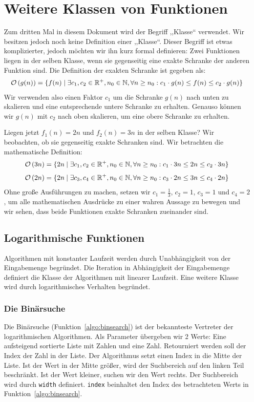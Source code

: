 \section{Weitere Klassen von Funktionen}
%
Zum dritten Mal in diesem Dokument wird der Begriff ,,Klasse`` verwendet. Wir besitzen jedoch noch keine Definition einer ,,Klasse``. Dieser Begriff ist etwas komplizierter, jedoch möchten wir ihn kurz formal definieren:
Zwei Funktionen liegen in der selben Klasse, wenn sie gegenseitig eine exakte Schranke der anderen Funktion sind. Die Definition der exakten Schranke ist gegeben als:
\[
  \mathcal{O}\left(g(n)\right) = \{ f(n) \mid \exists c_1, c_2 \in \mathbb{R}^+, n_0 \in \mathbb{N},
                 \forall n \geq n_0: c_1 \cdot g(n) \leq f(n) \leq c_2 \cdot g(n) \}
\]
%
Wir verwenden also einen Faktor $c_1$ um die Schranke $g(n)$ nach unten zu skalieren und eine entsprechende untere Schranke zu erhalten. Genauso können wir $g(n)$ mit $c_2$ nach oben skalieren, um eine obere Schranke zu erhalten.

Liegen jetzt $f_1(n) = 2n$ und $f_2(n) = 3n$ in der selben Klasse? Wir beobachten, ob sie gegenseitig exakte Schranken sind. Wir betrachten die mathematische Definition:
\[
  \mathcal{O}\left(3n\right) = \{ 2n \mid \exists c_1, c_2 \in \mathbb{R}^+, n_0 \in \mathbb{N},
              \forall n \geq n_0: c_1 \cdot 3n \leq 2n \leq c_2 \cdot 3n \}
\] \[
  \mathcal{O}\left(2n\right) = \{ 2n \mid \exists c_3, c_4 \in \mathbb{R}^+, n_0 \in \mathbb{N},
              \forall n \geq n_0: c_3 \cdot 2n \leq 3n \leq c_4 \cdot 2n \}
\]
%
Ohne große Ausführungen zu machen, setzen wir $c_1 = \frac13$, $c_2 = 1$, $c_3 = 1$ und $c_4 = 2$, um alle mathematischen Ausdrücke zu einer wahren Aussage zu bewegen und wir sehen, dass beide Funktionen exakte Schranken zueinander sind.
%
\subsection{Logarithmische Funktionen}
%
Algorithmen mit konstanter Laufzeit werden durch Unabhängigkeit von der Eingabemenge begründet.
Die Iteration in Abhängigkeit der Eingabemenge definiert die Klasse der Algorithmen mit linearer Laufzeit.
Eine weitere Klasse wird durch logarithmisches Verhalten begründet.
%
\subsubsection{Die Binärsuche}
%
Die Binärsuche (Funktion~\ref{algo:binsearch}) ist der bekannteste Vertreter der logarithmischen Algorithmen. Als Parameter übergeben wir 2 Werte: Eine aufsteigend sortierte Liste mit Zahlen und eine Zahl. Retourniert werden soll der Index der Zahl in der Liste. Der Algorithmus setzt einen Index in die Mitte der Liste. Ist der Wert in der Mitte größer, wird der Suchbereich auf den linken Teil beschränkt. Ist der Wert kleiner, suchen wir den Wert rechts. Der Suchbereich wird durch \verb=width= definiert. \verb=index= beinhaltet den Index des betrachteten Werts in Funktion~\ref{algo:binsearch}.

